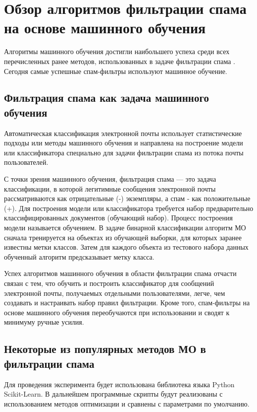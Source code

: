 \setcounter{chapter}{1}
\setcounter{section}{0}
\chapter*{Обзор алгоритмов фильтрации спама на основе машинного обучения}\label{Chapter:ML}
Алгоритмы машинного обучения достигли наибольшего успеха среди всех 
перечисленных ранее методов, использованных в задаче фильтрации спама 
\cite{filters}. Сегодня самые успешные спам-фильтры используют машинное обучение.
\section{Фильтрация спама как задача машинного обучения}
Автоматическая классификация электронной почты использует статистические подходы 
или методы машинного обучения и направлена ​​на построение модели или классификатора 
специально для задачи фильтрации спама из потока почты пользователей.

С точки зрения машинного обучения, фильтрация спама — это задача классификации, 
в которой легитимные сообщения электронной почты рассматриваются как отрицательные 
(-) экземпляры, а спам - как положительные (+). 
Для построения модели или классификатора требуется набор предварительно классифицированных 
документов (обучающий набор). Процесс построения модели называется обучением. 
В задаче бинарной классификации алгоритм МО сначала тренируется на объектах из 
обучающей выборки, для которых заранее известны метки классов. Затем для каждого 
объекта из тестового набора данных обученный алгоритм предсказывает метку класса. 

Успех алгоритмов машинного обучения в области фильтрации спама отчасти связан с тем, что 
обучить и построить классификатор для сообщений электронной почты, получаемых отдельными 
пользователями, легче,  чем создавать и настраивать набор правил фильтрации. Кроме того, 
спам-фильтры на основе машинного обучения переобучаются при использовании и сводят к 
минимуму ручные усилия.


\section{Некоторые из популярных методов МО в фильтрации спама}
Для проведения эксперимента будет использована библиотека языка Python Scikit-Learn.
В дальнейшем программные скрипты будут реализованы с использованием методов 
оптимизации и сравнены с параметрами по умолчанию.

